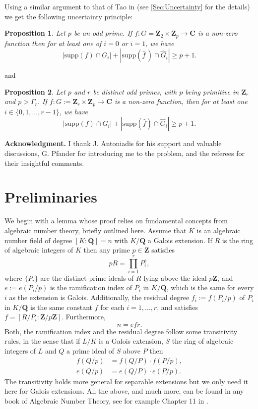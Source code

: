 \documentclass[a4paper,12pt,reqno]{amsart}
\newtheorem{proposition}{Proposition}
\def\Z{\mathbf{Z}}
\def\C{\mathbf{C}}
\def\Q{\mathbf{Q}}
\def\supp{\mathrm{supp}}
\begin{document}
Using a similar argument to that of Tao in \cite{Tao}
(see \autoref{Sec:Uncertainty} for the details) we get the following uncertainty  principle:
\begin{proposition}\label{Prop:Unc-A}
Let $ p$ be an odd prime. If $f: G= \Z_2 \times \Z_p \to \C $ is a non-zero function  then for at least one of $i=0 $ or $ i=1 $, we have 
\[
|\supp(f) \cap G_i| + |\supp(\widehat{f} \, ) \cap \widehat{G}_i| \geq p + 1.
\]
\end{proposition}
and 
\begin{proposition}\label{Prop:Unc-B}
Let $p$ and $r$ be distinct odd primes, with $p$ being primitive in $\Z_r$ and $p > \Gamma_r$. If $f: G:= \Z_r \times \Z_p \to \C$ is a non-zero function, then for at least one $i \in \{0, 1, \ldots, r-1\}$, we have 
\[
|\supp(f) \cap G_i| + |\supp(\widehat{f}) \cap \widehat{G}_i| \geq p + 1.
\]
\end{proposition}


{\bf Acknowledgment.}
I thank J. Antoniadis for his support and valuable discussions, G. Pfander for introducing me to the problem, and the referees for their insightful comments.


\section{Preliminaries}\label{Sec:prelim}

We begin with a lemma whose proof relies on fundamental concepts from algebraic number theory, briefly outlined here. Assume that $K$ is an  algebraic number field of degree $[K:\Q]=n$ with $K/\Q$ a Galois extension.  If $R$ is  the ring of algebraic  integers of $K$ then  any prime $p \in \Z$ satisfies  
\[
pR = \prod_{i=1}^r P_i^e, 
\]
where $\{ P_i \}$ are  the distinct prime ideals of $R$ lying above the ideal $p\Z$, and  $e:= e(P_i/p)$ is the ramification index of $P_i$ in $K/\Q$, which is the same for every $i$ as the extension is Galois.  Additionally, the residual degree $f_i:= f(P_i/p)$ of $P_i$ in $K/\Q$ is the same constant $f$ for each $i=1, \ldots, r$, and satisfies $f = [R/P_i : \Z/p\Z]$. Furthermore,
\begin{equation}\label{eq:efr}
 n=efr.   
\end{equation}
Both,  the ramification index and the residual degree follow some transitivity rules, in the sense that if $L/K$ is  a Galois extension, $S$ the ring of algebraic integers of $L$ and $Q$  a prime ideal of $S$ above $P$ then 
\begin{align*}
   f(Q/p)&= f(Q/P)\cdot f(P/p), \\
   e(Q/p)&= e(Q/P)\cdot e(P/p).
\end{align*}
The transitivity holds more general for separable extensions but we only need it here for Galois extensions.  All the above,  and much more, can be found in any book of Algebraic Number Theory, see for example Chapter 11 in \cite{Ribe}.
\end{document}
